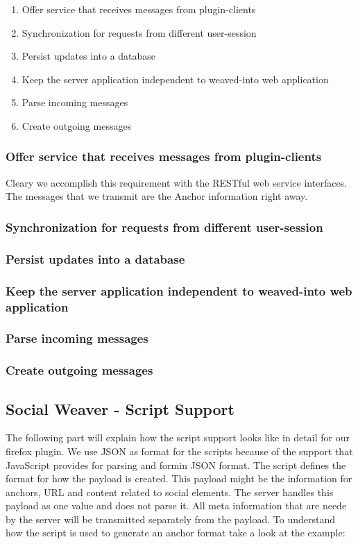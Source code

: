 \begin{enumerate}
	\item Offer service that receives messages from plugin-clients
	\item Synchronization for requests from different user-session
	\item Persist updates into a database
	\item Keep the server application independent to weaved-into web application
	\item Parse incoming messages
	\item Create outgoing messages
\end{enumerate}

\subsubsection{Offer service that receives messages from plugin-clients}
Cleary we accomplish this requirement with the RESTful web service interfaces. The messages that we transmit are the Anchor information right away. 


\subsubsection{Synchronization for requests from different user-session}

\subsubsection{Persist updates into a database}

\subsubsection{Keep the server application independent to weaved-into web application}

\subsubsection{Parse incoming messages}

\subsubsection{Create outgoing messages}

\subsection{Social Weaver - Script Support}
The following part will explain how the script support looks like in detail for our firefox plugin. We use JSON as format for the scripts because of the support that JavaScript provides for parsing and formin JSON format. The script defines the format for how the payload is created. This payload might be the information for anchors, URL and content related to social elements. The server handles this payload as one value and does not parse it. All meta information that are neede by the server will be transmitted separately from the payload. To understand how the script is used to generate an anchor format take a look at the example:

